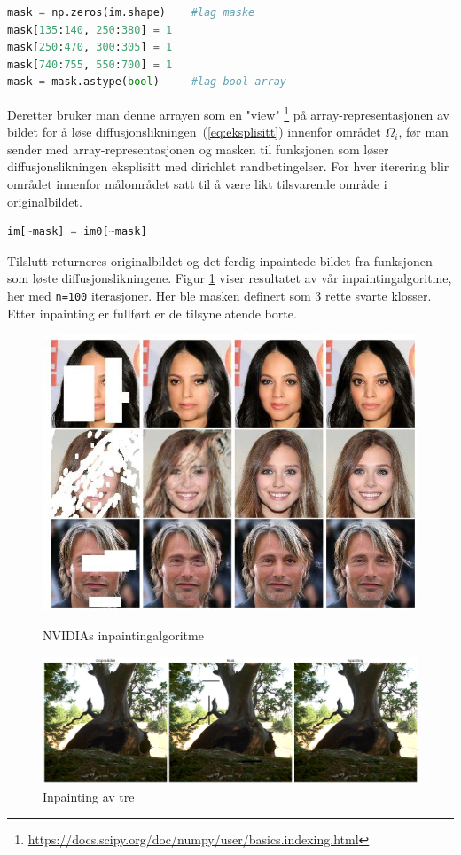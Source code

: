 \begin{lstlisting}[language=Python]
mask = np.zeros(im.shape)    #lag maske
mask[135:140, 250:380] = 1
mask[250:470, 300:305] = 1
mask[740:755, 550:700] = 1
mask = mask.astype(bool)     #lag bool-array
\end{lstlisting}
 
Deretter bruker man denne arrayen som en "view" \footnote{\url{https://docs.scipy.org/doc/numpy/user/basics.indexing.html}} på array-representasjonen av bildet for å løse diffusjonslikningen~(\ref{eq:eksplisitt}) innenfor området $\Omega_i$, før man sender med array-representasjonen og masken til funksjonen som løser diffusjonslikningen eksplisitt med dirichlet randbetingelser. For hver iterering blir området innenfor målområdet satt til å være likt tilsvarende område i originalbildet.
\begin{lstlisting}[language=Python]
    im[~mask] = im0[~mask]
\end{lstlisting}
Tilslutt returneres originalbildet og det ferdig inpaintede bildet fra funksjonen som løste diffusjonslikningene. Figur \ref{fig:inpaint} viser resultatet av vår inpaintingalgoritme, her med \texttt{n=100} iterasjoner. Her ble masken definert som 3 rette svarte klosser. Etter inpainting er fullført er de tilsynelatende borte.
\begin{figure}
\begin{center}
    \includegraphics[width=0.4\columnwidth]{bilder/Inpainting/nvidia-image-inpainting-demo.jpg}
    \caption{NVIDIAs inpaintingalgoritme~ \label{fig:nvidia}}
    \includegraphics[width=1\columnwidth]{bilder/Inpainting/tree_inpaint.png}
    \caption{Inpainting av tre~ \label{fig:inpaint}}
\end{center}
\end{figure}
